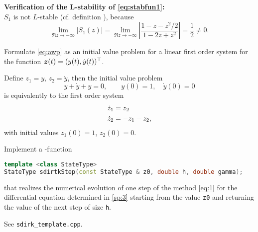 \begin{problem}
\begin{subproblem}[1]
\begin{solution}
\textbf{Verification of the L-stability of \eqref{eq:stabfun1}:}\\
$S_1$ is not $L$-stable (cf. definition ), because
\begin{equation*}
	\lim_{\Re z\to -\infty} |S_1(z)| = \lim_{\Re z\to-\infty} \left|\frac{1-z-z^2/2}{1-2z+z^2}\right| = \frac{1}{2} \ne 0.
\end{equation*}

\end{solution}
\end{subproblem}

\begin{subproblem}[1] \label{sp:3}
Formulate \eqref{eq:awp} as an initial value problem for a linear first order system for the function ${\boldsymbol{z}}(t) = (y(t),\dot{y}(t))^\top$.

\begin{solution}
Define $z_1=y$, $z_2=\dot{y}$, then the initial value problem
\begin{equation}\label{eq:awp2}
	\ddot{y} + \dot{y} + y = 0,\qquad y(0)=1,\quad \dot{y}(0) = 0
\end{equation}
is equivalently to the first order system
\begin{align}\label{eq:system}
	\dot{z}_1 &= z_2 \notag\\
	\dot{z}_2 &= -z_1 -z_2,
\end{align}
with initial values $z_1(0)=1$, $z_2(0)=0$.
\end{solution}

\end{subproblem}

\begin{subproblem}[1]\label{sp:4}
Implement a \Cpp{}-function
\begin{lstlisting}[language=c++]
template <class StateType>
StateType sdirtkStep(const StateType & z0, double h, double gamma);
\end{lstlisting}
that realizes the numerical evolution of one step of the method \eqref{eq:1} for the differential equation determined in \autoref{sp:3} starting from the value \verb|z0| and returning the value of the next step of size \verb|h|.

\begin{hint}
See \verb|sdirk_template.cpp|.
\end{hint}


\end{subproblem}
\end{problem}
